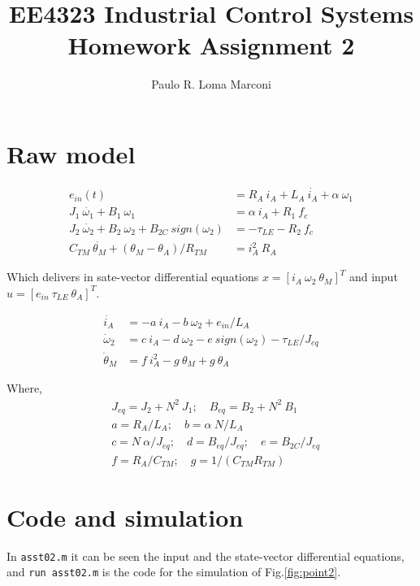 \documentclass[]{article}
\title{EE4323 Industrial Control Systems\\ 
	Homework Assignment 2}
\author{Paulo R. Loma Marconi}
\begin{document}
\maketitle

\section{Raw model}

\begin{align}
e_{in}(t) &= R_A\ i_A + L_A\ \dot{i_A}+\alpha\ \omega_1 \\
J_1\ \dot{\omega_1} + B_1\ \omega_1 &= \alpha\ i_A + R_1\ f_c \\
J_2\ \dot{\omega_2} + B_2\ \omega_2 + B_{2C}\ sign(\omega_2) &= -\tau_{LE}-R_2\ f_c \\
C_{TM}\ \dot{\theta_M} + (\theta_M - \theta_A)/R_{TM} &= i^2_A\ R_A
\end{align}

Which delivers in sate-vector differential equations  
$x = [ i_A\ \omega_2\ \theta_M ]^T $ and input $u = [ e_{in}\ \tau_{LE}\ \theta_A ]^T$.

\begin{align}
\dot{i_A} &= -a\ i_A - b\ \omega_2 + e_{in}/L_A \\
\dot{\omega}_2 &= c\ i_A - d\ \omega_2 - e\ sign(\omega_2) - \tau_{LE}/J_{eq}\\
\dot{\theta}_M &= f\ i^2_A - g\ \theta_M + g\ \theta_A
\end{align}

Where,
\begin{align*}
&J_{eq}=J_2+N^2\ J_1;\quad B_{eq}=B_2+N^2\ B_1\\
&a=R_A/L_A;\quad b=\alpha\ N/L_A\\
&c=N\ \alpha/J_{eq};\quad d=B_{eq}/J_{eq};\quad e=B_{2C}/J_{eq}\\
&f=R_A/C_{TM};\quad g=1/(C_{TM} R_{TM})
\end{align*}

\section{Code and simulation}
In \verb|asst02.m| it can be seen the input and the state-vector differential equations, and \verb|run asst02.m| is the code for the simulation of  Fig.\ref{fig:point2}.
\end{document}
